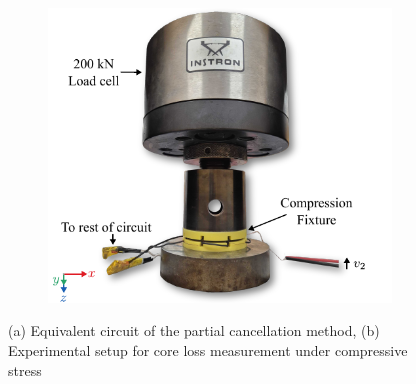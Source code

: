 \documentclass[conference]{IEEEtran}
\begin{document}
\begin{figure}[t]
  \begin{subfigure}{\columnwidth}
    \centering
    
    \caption{}
    \label{fig:partialcancellationcircuit}
  \end{subfigure}

  \vspace{1em}

  \begin{subfigure}{\columnwidth}
    \centering
    \includegraphics{figures/experimentalsetup.pdf}
    \caption{}
    \label{fig:experimentalsetup}
  \end{subfigure}
  \caption{(a) Equivalent circuit of the partial cancellation method, (b) Experimental setup for core loss measurement under compressive stress}
\end{figure}
\end{document}
